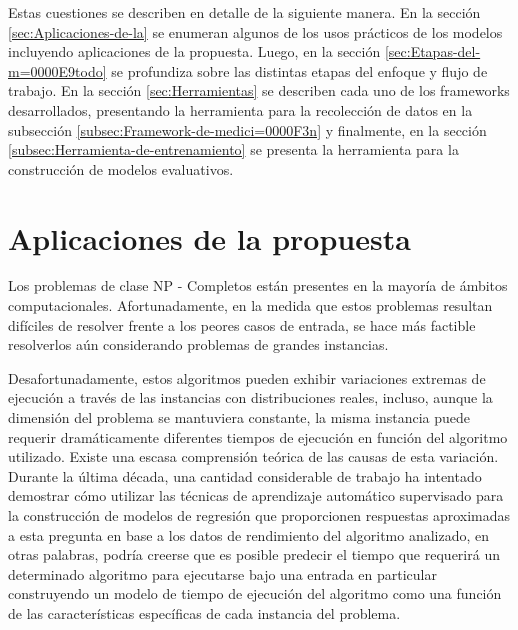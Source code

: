 Estas cuestiones se describen en detalle de la siguiente manera. En
la sección \ref{sec:Aplicaciones-de-la} se enumeran algunos de los
usos prácticos de los modelos incluyendo aplicaciones de la propuesta.
Luego, en la sección \ref{sec:Etapas-del-m=0000E9todo} se profundiza
sobre las distintas etapas del enfoque y flujo de trabajo. En la sección
\ref{sec:Herramientas} se describen cada uno de los frameworks desarrollados,
presentando la herramienta para la recolección de datos en la subsección
\ref{subsec:Framework-de-medici=0000F3n} y finalmente, en la sección
\ref{subsec:Herramienta-de-entrenamiento} se presenta la herramienta
para la construcción de modelos evaluativos. 


\section{Aplicaciones de la propuesta \label{sec:Aplicaciones-de-la}}

Los problemas de clase NP - Completos están presentes en la mayoría
de ámbitos computacionales. Afortunadamente, en la medida que estos
problemas resultan difíciles de resolver frente a los peores casos
de entrada, se hace más factible resolverlos aún considerando problemas
de grandes instancias. 

Desafortunadamente, estos algoritmos pueden exhibir variaciones extremas
de ejecución a través de las instancias con distribuciones reales,
incluso, aunque la dimensión del problema se mantuviera constante,
la misma instancia puede requerir dramáticamente diferentes tiempos
de ejecución en función del algoritmo utilizado. Existe una escasa
comprensión teórica de las causas de esta variación. Durante la última
década, una cantidad considerable de trabajo ha intentado demostrar
cómo utilizar las técnicas de aprendizaje automático supervisado para
la construcción de modelos de regresión que proporcionen respuestas
aproximadas a esta pregunta en base a los datos de rendimiento del
algoritmo analizado, en otras palabras, podría creerse que es posible
predecir el tiempo que requerirá un determinado algoritmo para ejecutarse
bajo una entrada en particular construyendo un modelo de tiempo de
ejecución del algoritmo como una función de las características específicas
de cada instancia del problema. 

